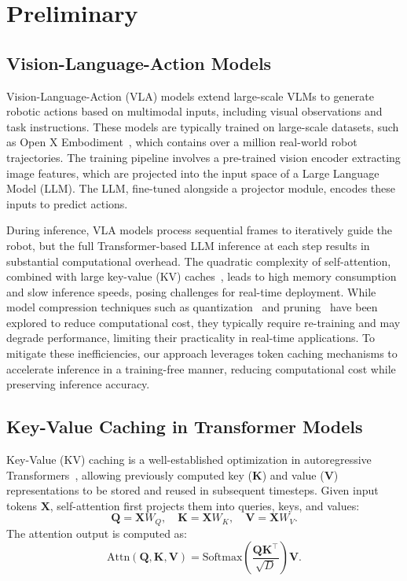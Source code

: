\section{Preliminary}
\subsection{Vision-Language-Action Models}
Vision-Language-Action (VLA) models extend large-scale VLMs to generate robotic actions based on multimodal inputs, including visual observations and task instructions. These models are typically trained on large-scale datasets, such as Open X Embodiment~\cite{o2024open}, which contains over a million real-world robot trajectories. The training pipeline involves a pre-trained vision encoder \cite{liu2021swin,radford2021learning} extracting image features, which are projected into the input space of a Large Language Model (LLM). The LLM, fine-tuned alongside a projector module, encodes these inputs to predict actions. 

During inference, VLA models process sequential frames to iteratively guide the robot, but the full Transformer-based LLM inference at each step results in substantial computational overhead. The quadratic complexity of self-attention, combined with large key-value (KV) caches~\cite{ge2023model}, leads to high memory consumption and slow inference speeds, posing challenges for real-time deployment. While model compression techniques such as quantization~\cite{lin2024awq} and pruning~\cite{park2024quantization, DeeR-VLA} have been explored to reduce computational cost, they typically require re-training and may degrade performance, limiting their practicality in real-time applications. To mitigate these inefficiencies, our approach leverages token caching mechanisms to accelerate inference in a training-free manner, reducing computational cost while preserving inference accuracy.

\subsection{Key-Value Caching in Transformer Models}
Key-Value (KV) caching is a well-established optimization in autoregressive Transformers~\cite{vaswani2017attention,floridi2020gpt}, allowing previously computed key ($\mathbf{K}$) and value ($\mathbf{V}$) representations to be stored and reused in subsequent timesteps. Given input tokens $\mathbf{X}$, self-attention first projects them into queries, keys, and values:
\begin{equation}
\mathbf{Q} = \mathbf{X} W_Q, \quad
\mathbf{K} = \mathbf{X} W_K, \quad
\mathbf{V} = \mathbf{X} W_V.
\end{equation}
The attention output is computed as:
\begin{equation}
\mathrm{Attn}(\mathbf{Q}, \mathbf{K}, \mathbf{V}) =
\mathrm{Softmax}\left(\frac{\mathbf{Q} \mathbf{K}^\top}{\sqrt{D}}\right) \mathbf{V}.
\end{equation}

